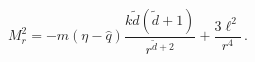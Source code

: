 \begin{equation}
M_{r}^2 = - m (\eta - \hat{q})\frac{k \tilde{d} (\tilde{d}
+1)}{r^{\tilde{d}+2}} + \frac{3\ell^2}{r^4} \, .
\end{equation}

